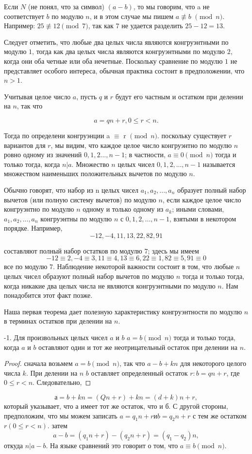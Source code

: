 \documentclass[11pt]{article}
\begin{document}
	Если $N$ (не понял, что за символ) $(a-b)$, то мы говорим, что a не соответствует $b$ по модулю $n$, и в этом случае мы пишем $a \not\equiv b$ $\pmod{n}$. Например: $25 \not\equiv 12 \pmod{7}$, так как $7$ не удается разделить $25-12 = 13$.
	
	Следует отметить, что любые два целых числа являются конгруэнтными по модулю $1$, тогда как два целых числа являются конгруэнтными по модулю $2$, когда они оба четные или оба нечетные. Поскольку сравнение по модулю $1$ не представляет особого интереса, обычная практика состоит в предположении, что $n> 1$.
	
	Учитывая целое число $a$, пусть $q$ и $r$ будут его частным и остатком при делении на $n$, так что
	
	\[
		a=qn+r,  0 \leq r<n.
	\]
	
	Тогда по определени конгруэнции a $\equiv$ r $\pmod{n}$. поскольку существует $r$ вариантов для $r$, мы видим, что каждое целое число конгруэнтно по модулю $n$ ровно одному из значений $0,1,2 ..., n-1$; в частности, $a \equiv 0 \pmod{n}$ тогда и только тогда, когда $n | a$. Множество $n$ целых чисел $0, 1, 2, ..., n-1$ называется множеством наименьших положительных вычетов по модулю $n$.
	
	Обычно говорят, что набор из n целых чисел $a_{1}, a_{2}, ..., a_{n}$ образует полный набор вычетов (или полную систему вычетов) по модулю $n$, если каждое целое число конгруэнтно по модулю $n$ одному и только одному из $a_{k}$; иными словами, $a_{1}, a_{2}, ..., a_{n}$ конгруэнтны по модулю $n$ с $0,1,2, ..., n-1$, взятыми в некотором порядке. Например,
	\[
		-12, -4,11,13,22,82,91
	\]
	
	составляют полный набор остатков по модулю $7$; здесь мы имеем
	\[
		-12 \equiv 2, -4 \equiv 3, 11 \equiv 4, 13 \equiv 6, 22 \equiv 1,82 \equiv 5,91 \equiv 0
	\]
	все по модулю $7$. Наблюдение некоторой важности состоит в том, что любые $n$ целых чисел образуют полный набор вычетов по модулю $n$ тогда и только тогда, когда никакие два целых числа не являются конгруэнтными по модулю $n$. Нам понадобится этот факт позже.
	
	Наша первая теорема дает полезную характеристику конгруэнтности по модулю $n$ в терминах остатков при делении на $n$.
	
		\begin{enumerate}
			-1. Для произвольных целых чисел $a$ и $b$ $a = b \pmod{n}$ тогда и только тогда, когда $a$ и $b$ оставляют один и тот же неотрицательный остаток при делении на $n$.
			\begin{proof}
				сначала возьмем $a = b \pmod{n}$, так что $a-b + kn$ для некоторого целого числа $k$. При делении на $n$ $b$ оставляет определенный остаток $r: b = qn + r$, где $0 \leq r <n$. Следовательно,
			\end{proof}
		\end{enumerate}
	\[
		а = b + kn = (Qn + r) + kn = (d + k) n + r,
	\]
	который указывает, что $а$ имеет тот же остаток, что и $б$.	
	С другой стороны, предположим, что мы можем записать $a = q_{1}n + r и b = q_{2}n + r$ с тем же остатком $r (0 \leq r <n)$. затем
	\[
		a-b = (q_{1}n + r) - (q_{2}n + r) = (q_{1}-q_{2}) n,
	\]
	откуда $n | a-b$. На языке сравнений это говорит о том, что $a \equiv b \pmod{n}$.
\end{document}
